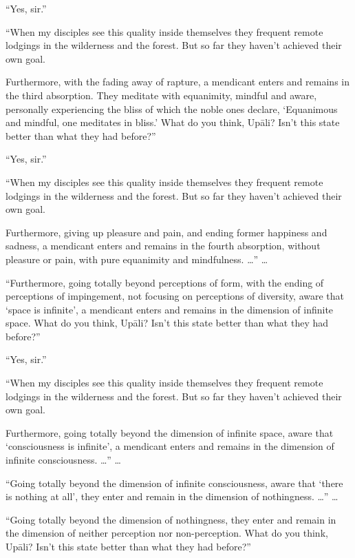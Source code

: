 \documentclass[12pt,openany]{book}%
\begin{document}
“Yes, sir.” 

“When my disciples see this quality inside themselves they frequent remote lodgings in the wilderness and the forest. But so far they haven’t achieved their own goal. 

Furthermore, with the fading away of rapture, a mendicant enters and remains in the third absorption. They meditate with equanimity, mindful and aware, personally experiencing the bliss of which the noble ones declare, ‘Equanimous and mindful, one meditates in bliss.’ What do you think, \textsanskrit{Upāli}? Isn’t this state better than what they had before?” 

“Yes, sir.” 

“When my disciples see this quality inside themselves they frequent remote lodgings in the wilderness and the forest. But so far they haven’t achieved their own goal. 

Furthermore, giving up pleasure and pain, and ending former happiness and sadness, a mendicant enters and remains in the fourth absorption, without pleasure or pain, with pure equanimity and mindfulness. …” … 

“Furthermore, going totally beyond perceptions of form, with the ending of perceptions of impingement, not focusing on perceptions of diversity, aware that ‘space is infinite’, a mendicant enters and remains in the dimension of infinite space. What do you think, \textsanskrit{Upāli}? Isn’t this state better than what they had before?” 

“Yes, sir.” 

“When my disciples see this quality inside themselves they frequent remote lodgings in the wilderness and the forest. But so far they haven’t achieved their own goal. 

Furthermore, going totally beyond the dimension of infinite space, aware that ‘consciousness is infinite’, a mendicant enters and remains in the dimension of infinite consciousness. …” … 

“Going totally beyond the dimension of infinite consciousness, aware that ‘there is nothing at all’, they enter and remain in the dimension of nothingness. …” … 

“Going totally beyond the dimension of nothingness, they enter and remain in the dimension of neither perception nor non-perception. What do you think, \textsanskrit{Upāli}? Isn’t this state better than what they had before?” 
\end{document}
